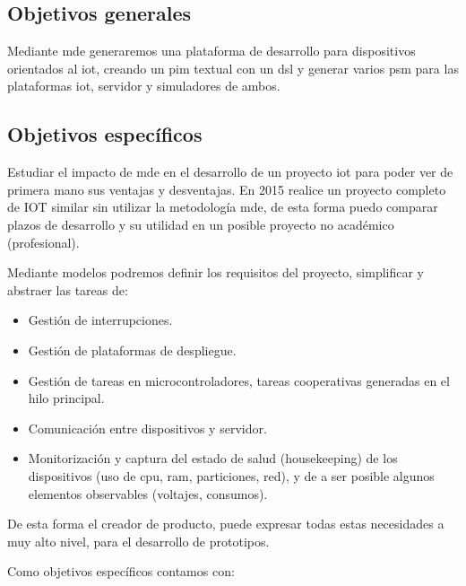 \subsection{Objetivos generales}

Mediante \gls{mde} generaremos una plataforma de desarrollo para dispositivos orientados al \gls{iot}, creando un \gls{pim} textual con un \gls{dsl} y generar varios \gls{psm} para las plataformas \gls{iot}, servidor y simuladores de ambos.

\subsection{Objetivos específicos}

Estudiar el impacto de \gls{mde} en el desarrollo de un proyecto \gls{iot} para poder ver de primera mano sus ventajas y desventajas. En 2015 realice un proyecto completo de IOT similar sin utilizar la metodología \gls{mde}, de esta forma puedo comparar plazos de desarrollo y su utilidad en un posible proyecto no académico (profesional).

Mediante modelos podremos definir los requisitos del proyecto, simplificar y abstraer las tareas de:

\begin{itemize}

\item Gestión de interrupciones.
\item Gestión de plataformas de despliegue.
\item Gestión de tareas en microcontroladores, tareas cooperativas generadas en el hilo principal.
\item Comunicación entre dispositivos y servidor.
\item Monitorización y captura del estado de salud (\gls{housekeeping}) de los dispositivos (uso de cpu, ram, particiones, red), y de a ser posible algunos elementos observables (voltajes, consumos).

\end{itemize}

De esta forma el creador de producto, puede expresar todas estas necesidades a muy alto nivel, para el desarrollo de prototipos.


Como objetivos específicos contamos con:

